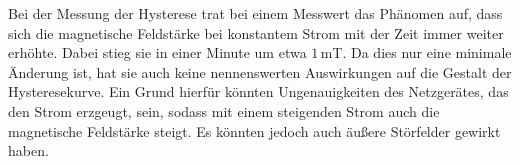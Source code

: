 Bei der Messung der Hysterese trat bei einem Messwert das Phänomen auf, dass sich
die magnetische Feldstärke bei konstantem Strom mit der Zeit immer weiter erhöhte.
Dabei stieg sie in einer Minute um etwa $1$\,mT. Da dies nur eine minimale Änderung
ist, hat sie auch keine nennenswerten Auswirkungen auf die Gestalt der Hysteresekurve.
Ein Grund hierfür könnten Ungenauigkeiten des Netzgerätes, das den Strom erzgeugt, sein,
sodass mit einem steigenden Strom auch die magnetische Feldstärke steigt. Es
könnten jedoch auch äußere Störfelder gewirkt haben.
